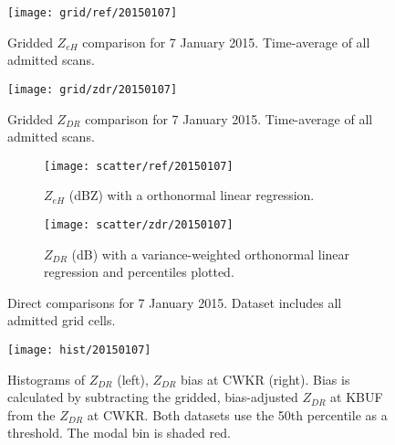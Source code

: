 \begin{figure}[H]
\texttt{[image: grid/ref/20150107]}
\caption{Gridded $Z_{eH}$ comparison for 7 January 2015. Time-average of all admitted scans.} 
\label{fig:grid_ref_20150107}
\end{figure}

\begin{figure}[H]
\texttt{[image: grid/zdr/20150107]}
\caption{Gridded $Z_{DR}$ comparison for 7 January 2015. Time-average of all admitted scans.} 
\label{fig:grid_zdr_20150107}
\end{figure}
\begin{figure}[H]
\centering
   \begin{subfigure}[t]{0.48\linewidth} \centering
     \texttt{[image: scatter/ref/20150107]}
     \caption{$Z_{eH}$ (dBZ) with a orthonormal linear regression.}\label{fig:scatter_ref_20150107}
   \end{subfigure}
   \begin{subfigure}[t]{0.48\linewidth} \centering
     \texttt{[image: scatter/zdr/20150107]}
     \caption{$Z_{DR}$ (dB) with a variance-weighted orthonormal linear regression and percentiles plotted.}\label{fig:scatter_zdr_20150107}
   \end{subfigure}
\caption{Direct comparisons for 7 January 2015. Dataset includes all admitted grid cells.} \label{fig:scatter_20150107}
\end{figure}

\begin{figure}[H]
\texttt{[image: hist/20150107]}\centering
\caption{Histograms of $Z_{DR}$ (left), $Z_{DR}$ bias at CWKR (right). Bias is calculated by subtracting the gridded, bias-adjusted $Z_{DR}$ at KBUF from the
$Z_{DR}$ at CWKR. Both datasets use the 50th percentile as a threshold. The modal bin is shaded red.} 
\label{fig:hist_20150107}
\end{figure}


